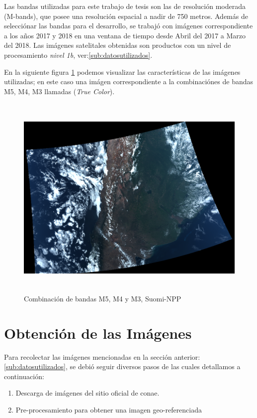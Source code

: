 Las bandas  utilizadas para este trabajo de tesis  son las  de resolución moderada (M-bands), que posee una resolución espacial a nadir de 750 metros. Además de selecciónar las bandas para el desarrollo, se trabajó con imágenes correspondiente a los años 2017 y 2018 en una ventana de tiempo desde Abril del 2017 a Marzo del 2018.  Las imágenes satelitales obtenidas son productos con  un nivel de procesamiento \textit{nivel 1b}, ver:\ref{sub:datosutilizados}.  

En la siguiente figura \ref{Fig: bandas543} podemos visualizar las características de las imágenes utilizadas; en este caso una imágen correspondiente a la combinaciónes de bandas M5, M4, M3 llamadas (\textit{True Color}).




\begin{figure}[h]
 \centering
  \includegraphics[height=10cm,keepaspectratio=true,clip=true]{imagenes/RecolecciondeDatos/img-543.png}
  \caption{Combinación de bandas M5, M4 y M3, Suomi-NPP}
	\label{Fig: bandas543}
\end{figure}


\section{Obtención de las Imágenes}\label{sub:obtencioimagen}

Para recolectar las imágenes mencionadas en la sección anterior: \ref{sub:datosutilizados}, se debió seguir diversos pasos de las cuales detallamos a continuación:
\begin{enumerate}
	\item Descarga de imágenes del sitio oficial de \ac{conae}.
	\item Pre-procesamiento para obtener una imagen geo-referenciada
\end{enumerate}

